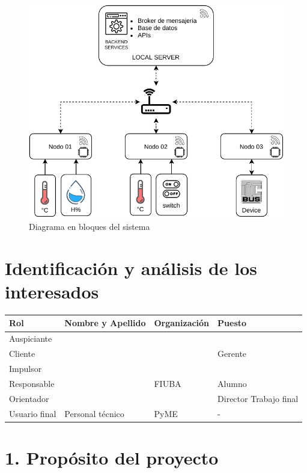 \documentclass[11pt]{charter}
\begin{document}
\begin{figure}[htpb]
\centering 
\includegraphics[width=.68\textwidth]{./Figuras/DiagramaEnBloques.pdf}
\caption{Diagrama en bloques del sistema}
\label{fig:diagBloques}
\end{figure}

\vspace{10px}


\section{Identificación y análisis de los interesados}
\label{sec:interesados}

\begin{table}[ht]
\begin{tabularx}{\linewidth}{@{}|l|X|X|l|@{}}
\hline
\rowcolor[HTML]{C0C0C0} 
Rol				& Nombre y Apellido & Organización 		& Puesto 	\\ \hline
Auspiciante		&					&					&			\\
Cliente			& \clientename      & \empclientename	& Gerente  	\\ 
Impulsor		&					&					&			\\	\hline
Responsable		& \authorname       & FIUBA        		& Alumno 	\\ \hline
Orientador		& \supname	      	& \pertesupname 	& Director	Trabajo final \\ \hline
Usuario final	& Personal técnico  & PyME           	& -       	\\ \hline
\end{tabularx}
\end{table}

\section{1. Propósito del proyecto}
\label{sec:proposito}
\end{document}
